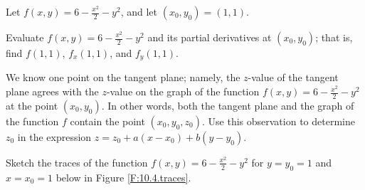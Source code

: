 \begin{pa} \label{PA:10.4}  Let $f(x,y) = 6 - \frac{x^2}2 - y^2$, and let $(x_0,y_0)
  = (1,1)$.
\ba
\item Evaluate $f(x,y) = 6 - \frac{x^2}2 - y^2$ and its partial derivatives at $(x_0,y_0)$;  that is, find $f(1,1)$, $f_x(1,1)$, and $f_y(1,1)$.

\item We know one point on the tangent plane;  namely, the $z$-value of the tangent
  plane agrees with the $z$-value on the graph of the function $f(x,y) = 6 - \frac{x^2}2 - y^2$ at the point $(x_0,
  y_0)$.  In other words, both the tangent plane and the graph of the function $f$ contain the point $(x_0, y_0, z_0)$. Use this observation to determine $z_0$ in the expression
  $z = z_0 + a(x-x_0) + b(y-y_0)$.

\item Sketch the traces of the function $f(x,y) = 6 - \frac{x^2}2 - y^2$ for $y=y_0=1$ and $x=x_0=1$
  below in Figure \ref{F:10.4.traces}.  


\end{pa}
